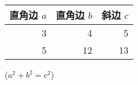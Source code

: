 \documentclass[UTF8]{ctexart}
\begin{document}
\begin{table}[H]
\begin{tabular}{|rrr|}
\hline
直角边 $a$ & 直角边 $b$ & 斜边 $c$\\
\hline
3 & 4 & 5 \\
5 & 12 & 13 \\
\hline
\end{tabular}%
\qquad %
($a^2 + b^2 = c^2$)
\end{table}
\end{document}
